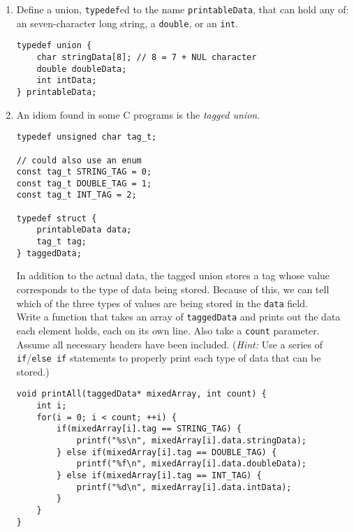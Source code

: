 \begin{enumerate}

\item Define a union, \texttt{typedef}ed to the name \texttt{printableData}, that can hold any of: an seven-character long string, a \texttt{double}, or an \texttt{int}.

\begin{answer}
\begin{verbatim}
typedef union {
    char stringData[8]; // 8 = 7 + NUL character
    double doubleData;
    int intData;
} printableData;
\end{verbatim}
\end{answer}

\item An idiom found in some C programs is the \textit{tagged union}.

\begin{verbatim}
typedef unsigned char tag_t;

// could also use an enum
const tag_t STRING_TAG = 0;
const tag_t DOUBLE_TAG = 1;
const tag_t INT_TAG = 2;

typedef struct {
    printableData data;
    tag_t tag;
} taggedData;
\end{verbatim}

In addition to the actual data, the tagged union stores a tag whose value corresponds to the type of data being stored.
Because of this, we can tell which of the three types of values are being stored in the \texttt{data} field.\\
Write a function that takes an array of \texttt{taggedData} and prints out the data each element holds, each on its own line.
Also take a \texttt{count} parameter.
Assume all necessary headers have been included.
(\textit{Hint:} Use a series of \texttt{if}/\texttt{else if} statements to properly print each type of data that can be stored.)

\begin{answer}
\begin{verbatim}
void printAll(taggedData* mixedArray, int count) {
    int i;
    for(i = 0; i < count; ++i) {
        if(mixedArray[i].tag == STRING_TAG) {
            printf("%s\n", mixedArray[i].data.stringData);
        } else if(mixedArray[i].tag == DOUBLE_TAG) {
            printf("%f\n", mixedArray[i].data.doubleData);
        } else if(mixedArray[i].tag == INT_TAG) {
            printf("%d\n", mixedArray[i].data.intData);
        }
    }
}
\end{verbatim}
\end{answer}


\end{enumerate}
